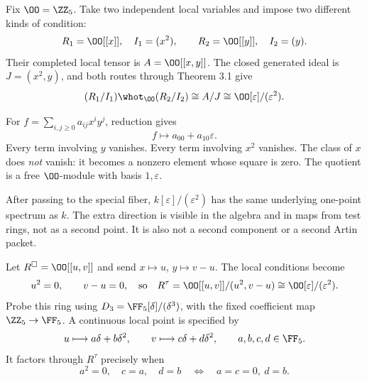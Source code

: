 Fix $\OO=\ZZ_5$. Take two independent local variables and impose two different kinds of condition:
\[
R_1=\OO[[x]],\quad I_1=(x^2),\qquad
R_2=\OO[[y]],\quad I_2=(y).
\]
Their completed local tensor is $A=\OO[[x,y]]$. The closed generated ideal is $J=(x^2,y)$, and both routes through Theorem 3.1 give
\[
(R_1/I_1)\whot_{\OO}(R_2/I_2)
\cong A/J
\cong \OO[\varepsilon]/(\varepsilon^2).
\]


For $f=\sum_{i,j\ge0}a_{ij}x^iy^j$, reduction gives
\[
f\longmapsto a_{00}+a_{10}\varepsilon.
\]
Every term involving $y$ vanishes. Every term involving $x^2$ vanishes. The class of $x$ does \emph{not} vanish: it becomes a nonzero element whose square is zero. The quotient is a free $\OO$-module with basis $1,\varepsilon$.

After passing to the special fiber, $k[\varepsilon]/(\varepsilon^2)$ has the same underlying one-point spectrum as $k$. The extra direction is visible in the algebra and in maps from test rings, not as a second point. It is also not a second component or a second Artin packet.


Let $R^\square=\OO[[u,v]]$ and send $x\mapsto u$, $y\mapsto v-u$. The local conditions become
\[
u^2=0,\qquad v-u=0,
\quad\text{so}\quad
R^\tau=\OO[[u,v]]/(u^2,v-u)\cong\OO[\varepsilon]/(\varepsilon^2).
\]
Probe this ring using $D_3=\FF_5[\delta]/(\delta^3)$, with the fixed coefficient map $\ZZ_5\to\FF_5$. A continuous local point is specified by
\[
u\longmapsto a\delta+b\delta^2,\qquad
v\longmapsto c\delta+d\delta^2,
\qquad a,b,c,d\in\FF_5.
\]
It factors through $R^\tau$ precisely when
\[
a^2=0,\quad c=a,\quad d=b
\quad\Longleftrightarrow\quad a=c=0,\ d=b.
\]

